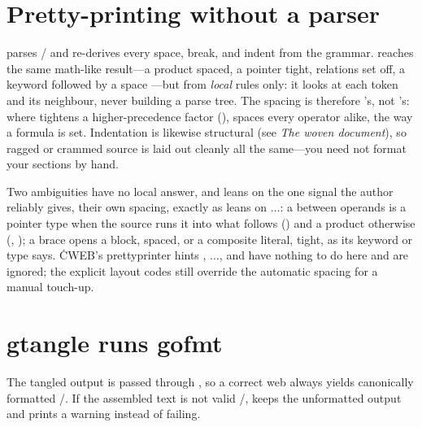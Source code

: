 \section{Pretty-printing without a parser}
 parses \CEE/ and re-derives every space, break, and indent from the
grammar.  reaches the same math-like result---a product 
spaced, a pointer  tight, relations set off, a keyword followed by a space
---but from {\it local\/} rules only: it looks at each token and its neighbour,
never building a parse tree. The spacing is therefore 's, not
's: where  tightens a higher-precedence factor (),
 spaces every operator alike, the way a formula is set. Indentation is
likewise structural (see {\it The woven document\/}), so ragged or crammed source
is laid out cleanly all the same---you need not format your sections by hand.

Two ambiguities have no local answer, and  leans on the one signal the
author reliably gives, their own spacing, exactly as  leans on
\cw{@[}\thinspace$\ldots$\thinspace\cw{@]}: a \cw{*} between operands is a pointer
type when the source runs it into what follows () and a product otherwise
(, ); a brace opens a block, spaced, or a composite literal,
tight, as its keyword or type says. \.{CWEB}'s prettyprinter hints ,
\cw{@[}\thinspace$\ldots$\thinspace\cw{@]}, and  have nothing to do here and
are ignored; the explicit layout codes     still
override the automatic spacing for a manual touch-up.

\section{gtangle runs gofmt}
The tangled output is passed through , so a correct web always yields
canonically formatted \GO/. If the assembled text is not valid \GO/, 
keeps the unformatted output and prints a warning instead of failing.

